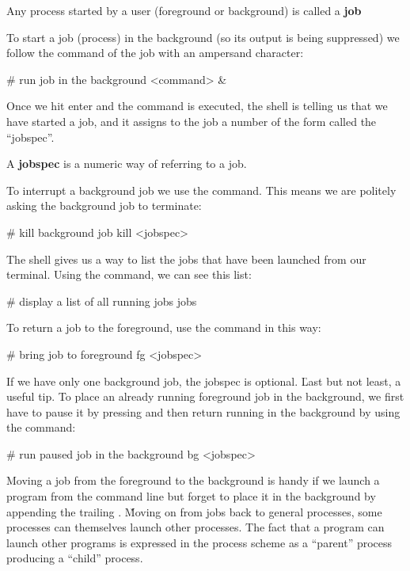 \bd[Job]
Any process started by a user (foreground or background) is called a \textbf{job}
\ed

To start a job (process) in the background (so its output is being suppressed) we follow the command of the job with an
ampersand character:
\begin{bash}
# run job in the background
<command> &
\end{bash}

Once we hit enter and the command is executed, the shell is telling us that we have started a job, and it assigns to
the job a number of the form  called the ``jobspec''.

\bd[Jobspec]
A \textbf{jobspec}  is a numeric way of referring to a job.
\ed

To interrupt a background job we use the  command. This means we are politely asking the background job to
terminate:
\begin{bash}
# kill background job
kill <jobspec>
\end{bash}

The shell gives us a way to list the jobs that have been launched from our terminal. Using the  command,
we can see this list:
\begin{bash}
# display a list of all running jobs
jobs
\end{bash}

To return a job to the foreground, use the  command in this way:
\begin{bash}
# bring job to foreground
fg <jobspec>
\end{bash}

If we have only one background job, the jobspec is optional. \v

Last but not least, a useful tip. To place an already running foreground job in the background, we first have to pause
it by pressing  and then return running in the background by using the  command:
\begin{bash}
# run paused job in the background
bg <jobspec>
\end{bash}

Moving a job from the foreground to the background is handy if we launch a program from the command line but forget
to place it in the background by appending the trailing \code{\text{\&}}. \v

Moving on from jobs back to general processes, some processes can themselves launch other processes. The fact that a
program can launch other programs is expressed in the process scheme as a ``parent'' process producing a ``child''
process.

